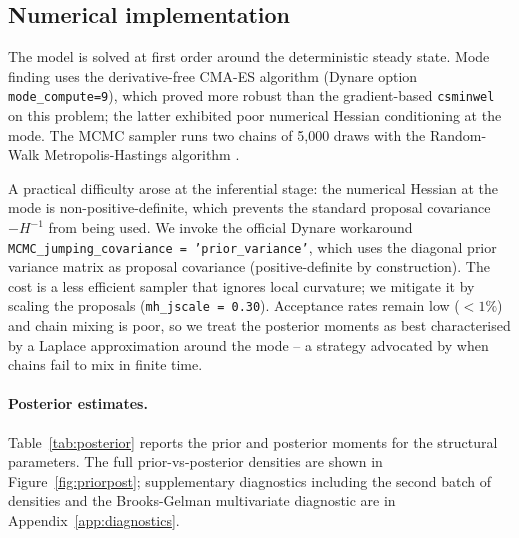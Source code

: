 \documentclass[11pt,a4paper]{article}
\begin{document}
\subsection{Numerical implementation}
The model is solved at first order around the deterministic
steady state. Mode finding uses the derivative-free CMA-ES algorithm
(Dynare option \texttt{mode\_compute=9}), which proved more robust
than the gradient-based \texttt{csminwel} on this problem; the latter
exhibited poor numerical Hessian conditioning at the mode. The MCMC
sampler runs two chains of 5{,}000 draws with the Random-Walk
Metropolis-Hastings algorithm \citep{HerbstSchorfheide2015}.

A practical difficulty arose at the inferential stage: the numerical
Hessian at the mode is non-positive-definite, which prevents the
standard proposal covariance $-H^{-1}$ from being used. We invoke
the official Dynare workaround
\texttt{MCMC\_jumping\_covariance = 'prior\_variance'}, which uses
the diagonal prior variance matrix as proposal covariance
(positive-definite by construction). The cost is a less efficient
sampler that ignores local curvature; we mitigate it by scaling the
proposals (\texttt{mh\_jscale = 0.30}). Acceptance rates remain low
($<1\%$) and chain mixing is poor, so we treat the posterior moments
as best characterised by a Laplace approximation around the mode --
a strategy advocated by \citet[\S6]{HerbstSchorfheide2015} when
chains fail to mix in finite time.

\paragraph{Posterior estimates.}
Table~\ref{tab:posterior} reports the prior and posterior moments
for the structural parameters. The full prior-vs-posterior densities
are shown in Figure~\ref{fig:priorpost}; supplementary diagnostics
including the second batch of densities and the Brooks-Gelman
multivariate diagnostic are in Appendix~\ref{app:diagnostics}.
\end{document}
